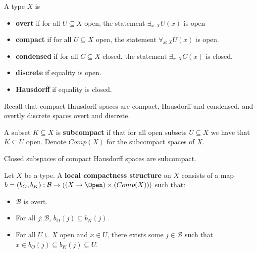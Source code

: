 \begin{definition}
  A type $X$ is 
  \begin{itemize}
    \item \textbf{overt} if for all $U\subseteq X$ open, the statement $\exists_{x:X} U(x)$ is open
    \item \textbf{compact} if for all $U\subseteq X$ open, the statement $\forall_{x:X} U(x)$ is open. 
    \item \textbf{condensed} if for all $C\subseteq X$ closed, the statement $\exists_{x:X} C(x)$ is closed. 
    \item \textbf{discrete} if equality is open. 
    \item \textbf{Hausdorff} if equality is closed. 
  \end{itemize}
\end{definition}
Recall that compact Hausdorff spaces are compact, Hausdorff and condensed, and overtly discrete spaces overt and discrete. 

\begin{definition}
  A subset $K\subseteq X$ is \textbf{subcompact} if that for all open subsets $U\subseteq X$ we have that $K\subseteq U$ open. 
  Denote $Comp(X)$ for the subcompact spaces of $X$. 
\end{definition}
\begin{remark}
  Closed subspaces of compact Hausdorff spaces are subcompact. 
\end{remark}

\begin{definition}
  Let $X$ be a type. A \textbf{local compactness structure} on $X$ consists of a map 
  $b = (b_O,b_K) : \mathcal B \to ((X \to \Open) \times (Comp(X)))$ such that:
  \begin{itemize}
    \item $\mathcal B$ is overt. 
    \item For all $j:\mathcal B$, $b_O(j) \subseteq b_K(j)$. 
    \item For all $U\subseteq X$ open and $x\in U$, there exists some $j\in\mathcal B$ such that $x \in b_O(j)\subseteq b_K(j) \subseteq U$. 
  \end{itemize}
\end{definition} 

